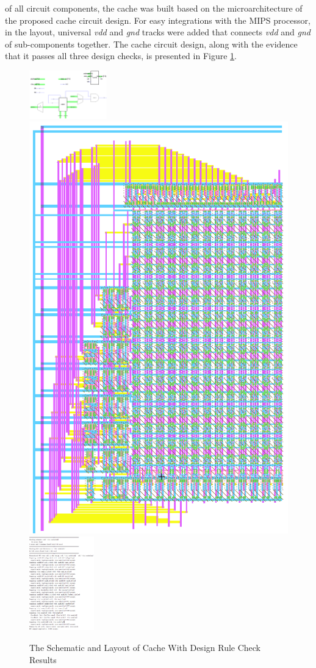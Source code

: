 \documentclass[conference]{IEEEtran}
\begin{document}
 of all circuit components, the cache was built based on the microarchitecture of the proposed cache circuit design. For easy integrations with the MIPS processor, in the layout, universal \textit{vdd} and \textit{gnd} tracks were added that connects \textit{vdd} and \textit{gnd} of sub-components together. The cache circuit design, along with the evidence that it passes all three design checks, is presented in Figure \ref{fig:cache}.

\begin{figure}[h!]
  \centering
    \includegraphics[width=0.3\textwidth]{cache_sch} \includegraphics[scale=0.3]{cache_lay} \includegraphics[width=0.25\textwidth]{cache_check}
  \caption{The Schematic and Layout of Cache With Design Rule Check Results}
  \label{fig:cache}
\end{figure}
\end{document}
